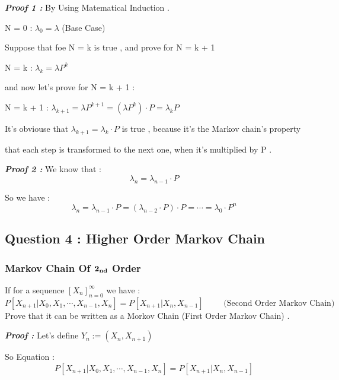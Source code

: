 \documentclass[a4paper]{article}
\begin{document}
		\large{\bf \emph{Proof 1 :}} By Using Matematical Induction .

		
		N = 0 : \hspace{\parindent} $\lambda_{0} = \lambda$ \hspace{2cm} (Base Case)
		
		Suppose that foe N = k is true , and prove for N = k + 1
		
		N = k : \hspace{\parindent} $\lambda_{k} = \lambda P^k$
		
		and now let's prove for N = k + 1 :
		
		N = k + 1 : \hspace{2\parindent} $\lambda_{k+1} = \lambda P^{k+1} = (\lambda P^k)\cdot P = \lambda_{k}P $
		\bigskip
		
		{It's obviouse that   $\lambda_{k+1} = \lambda_{k}\cdot P$ is true , because it's the Markov
		chain's property
		
		that each step is transformed to the next one, when it's multiplied by P .}
		
		\bigskip
		
		\large{\bf \emph{Proof 2 :}}
		We know that : \[\lambda_{n} = \lambda_{n-1}\cdot P\]
		
		So we have : \[\lambda_{n} = \lambda_{n-1}\cdot P = (\lambda_{n-2}\cdot P )\cdot P = \cdots = \lambda_{0}\cdot P^n\]
		
		\subsection{{\Large Question 4 :} Higher Order Markov Chain}
		\subsubsection{Markov Chain Of \texorpdfstring{$\bf 2_{nd}$}{Lg} Order}
			If for a sequence $\displaystyle{[X_{n}]_{n=0}^{\infty}}$ we have : \[P[X_{n+1} | X_0 , X_1 , \cdots , X_{n-1} , X_{n}] = P[X_{n+1} | X_{n} , X_{n-1}]\hspace{1cm} \text{(Second Order Markov Chain)}\] Prove that it can be written as a Morkov Chain (First Order Markov Chain) .
			
			\large{\bf \emph{Proof :}} Let's define  $Y_n := (X_n , X_{n+1})$
			
			So Equation : \[P[X_{n+1} | X_0 , X_1 , \cdots , X_{n-1} , X_{n}] = P[X_{n+1} | X_{n} , X_{n-1}]\]
			
			
\end{document}
